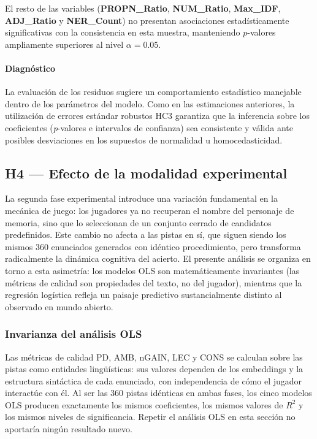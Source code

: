 \documentclass[../main.tex]{subfiles}
\begin{document}
El resto de las variables (\textbf{PROPN\_Ratio}, \textbf{NUM\_Ratio}, \textbf{Max\_IDF}, \textbf{ADJ\_Ratio} y \textbf{NER\_Count}) no presentan asociaciones estadísticamente significativas con la consistencia en esta muestra, manteniendo $p$-valores ampliamente superiores al nivel $\alpha = 0.05$.

\paragraph{Diagnóstico}

La evaluación de los residuos sugiere un comportamiento estadístico manejable dentro de los parámetros del modelo. Como en las estimaciones anteriores, la utilización de errores estándar robustos HC3 garantiza que la inferencia sobre los coeficientes (\textit{p}-valores e intervalos de confianza) sea consistente y válida ante posibles desviaciones en los supuestos de normalidad u homocedasticidad.


\subsection{H4 --- Efecto de la modalidad experimental}

La segunda fase experimental introduce una variación fundamental en la mecánica de juego: los jugadores ya no recuperan el nombre del personaje de memoria, sino que lo seleccionan de un conjunto cerrado de candidatos predefinidos. Este cambio no afecta a las pistas en sí, que siguen siendo los mismos 360 enunciados generados con idéntico procedimiento, pero transforma radicalmente la dinámica cognitiva del acierto. El presente análisis se organiza en torno a esta asimetría: los modelos OLS son matemáticamente invariantes (las métricas de calidad son propiedades del texto, no del jugador), mientras que la regresión logística refleja un paisaje predictivo sustancialmente distinto al observado en mundo abierto.

\subsubsection{Invarianza del análisis OLS}

Las métricas de calidad PD, AMB, nGAIN, LEC y CONS se calculan sobre las pistas como entidades lingüísticas: sus valores dependen de los embeddings y la estructura sintáctica de cada enunciado, con independencia de cómo el jugador interactúe con él. Al ser las 360 pistas idénticas en ambas fases, los cinco modelos OLS producen exactamente los mismos coeficientes, los mismos valores de $R^2$ y los mismos niveles de significancia. Repetir el análisis OLS en esta sección no aportaría ningún resultado nuevo.
\end{document}
